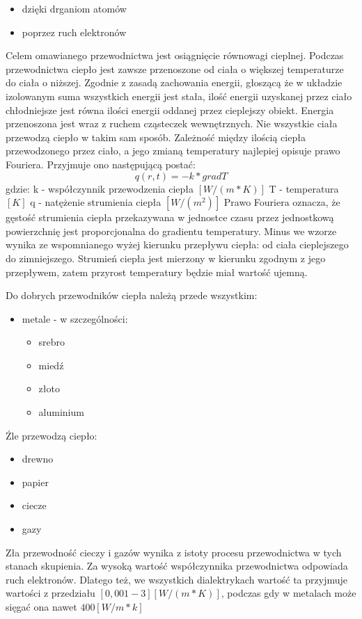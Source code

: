 \begin{itemize}
\item dzięki drganiom atomów
\item poprzez ruch elektronów
\end {itemize}
Celem omawianego przewodnictwa jest 
osiągnięcie równowagi cieplnej. Podczas przewodnictwa ciepło jest zawsze przenoszone od
ciała o większej temperaturze do ciała o niższej. Zgodnie z zasadą zachowania energii, głoszącą że w układzie 
izolowanym suma wszystkich energii jest stała, ilość energii uzyskanej przez ciało chłodniejsze jest równa
ilości energii oddanej przez cieplejszy obiekt. Energia przenoszona jest wraz z ruchem cząsteczek wewnętrznych.
Nie wszystkie ciała przewodzą ciepło w takim sam sposób.
Zależność między ilością ciepła przewodzonego przez ciało, a jego zmianą temperatury najlepiej opisuje prawo Fouriera.
Przyjmuje ono następującą postać:
\begin{equation}
 q(r,t)=-k*grad T
 \label{eqn:fourier}
\end {equation}
gdzie:
k - współczynnik przewodzenia ciepła $[W / (m*K)]$
T - temperatura $[K]$
q - natężenie strumienia ciepła  $[W/(m^2)]$
Prawo Fouriera oznacza, że gęstość strumienia ciepła przekazywana w jednostce czasu przez jednostkową powierzchnię 
jest proporcjonalna do gradientu temperatury. Minus we wzorze wynika ze wspomnianego wyżej kierunku przepływu ciepła:
od ciała cieplejszego do zimniejszego. Strumień ciepła jest mierzony w kierunku zgodnym z jego przepływem, zatem przyrost
temperatury będzie miał wartość ujemną.


Do dobrych przewodników ciepła należą przede wszystkim:
\begin {itemize}
\item metale - w szczególności:
	\begin{itemize} 
		\item srebro
		\item miedź
		\item złoto
		\item aluminium
	\end{itemize}
\end {itemize}
Źle przewodzą ciepło:
\begin {itemize}
\item drewno
\item papier
\item ciecze
\item gazy
\end {itemize}
Zła przewodność cieczy i gazów wynika z istoty procesu przewodnictwa w tych stanach skupienia. Za wysoką wartość 
współczynnika przewodnictwa odpowiada ruch elektronów. Dlatego też, we wszystkich dialektrykach wartość ta
przyjmuje wartości z przedziału $[0,001-3][W/(m*K)]$, podczas gdy w metalach może sięgać ona nawet $ 400 [W/m*k]$

